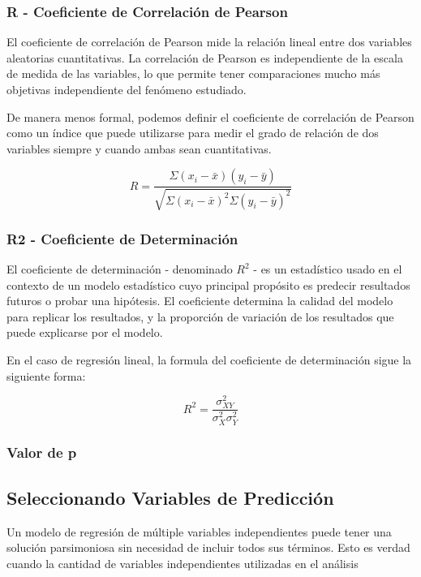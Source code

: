 \subsubsection{R - Coeficiente de Correlación de Pearson}
El coeficiente de correlación de Pearson mide la relación lineal entre dos variables aleatorias cuantitativas. La correlación de Pearson es independiente de la escala de medida de las variables, lo que permite tener comparaciones mucho más objetivas independiente del fenómeno estudiado.

De manera menos formal, podemos definir el coeficiente de correlación de Pearson como un índice que puede utilizarse para medir el grado de relación de dos variables siempre y cuando ambas sean cuantitativas.

\[R = \frac{\Sigma(x_i - \bar{x})(y_i - \bar{y})}{\sqrt{\Sigma(x_i - \bar{x})^2\Sigma(y_i - \bar{y})^2}}\]

\subsubsection{R2 - Coeficiente de Determinación}
El coeficiente de determinación - denominado \(R^{2}\) - es un estadístico usado en el contexto de un modelo estadístico cuyo principal propósito es predecir resultados futuros o probar una hipótesis. El coeficiente determina la calidad del modelo para replicar los resultados, y la proporción de variación de los resultados que puede explicarse por el modelo. 

En el caso de regresión lineal, la formula del coeficiente de determinación sigue la siguiente forma:

\[R^{2} = \frac{\sigma^{2}_{XY}}{\sigma^{2}_{X}\sigma^{2}_{Y}}\]

\subsubsection{Valor de p}

\subsection{Seleccionando Variables de Predicción}
Un modelo de regresión de múltiple variables independientes puede tener una solución parsimoniosa sin necesidad de incluir todos sus términos. Esto es verdad cuando la cantidad de variables independientes utilizadas en el análisis 
